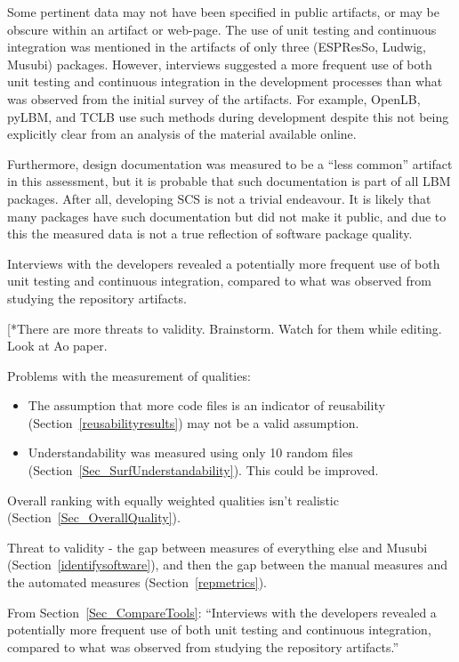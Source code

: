 \documentclass[runningheads]{llncs}
\begin{document}
Some pertinent data may not have been specified in public artifacts, or may be
obscure within an artifact or web-page. The use of unit testing and continuous
integration was mentioned in the artifacts of only three (ESPResSo, Ludwig,
Musubi) packages. However, interviews suggested a more frequent use of both unit
testing and continuous integration in the development processes than what was
observed from the initial survey of the artifacts. For example, OpenLB, pyLBM,
and TCLB use such methods during development despite this not being explicitly
clear from an analysis of the material available online. 

Furthermore, design documentation was measured to be a ``less common'' artifact
in this assessment, but it is probable that such documentation is part of all
LBM packages. After all, developing SCS is not a trivial endeavour. It is likely
that many packages have such documentation but did not make it public, and due
to this the measured data is not a true reflection of software package quality.

Interviews with the developers revealed a potentially more frequent use of both
unit testing and continuous integration, compared to what was observed from
studying the repository artifacts.

[*{There are more threats to validity.  Brainstorm.  Watch for them while 
editing.  Look at Ao paper.}

Problems with the measurement of qualities:

\begin{itemize}
\item The assumption that more code files is an indicator of reusability
(Section~\ref{reusabilityresults}) may not be a valid assumption.
\item Understandability was measured using only 10 random files
(Section~\ref{Sec_SurfUnderstandability}).  This could be improved.
\end{itemize}

Overall ranking with equally weighted qualities isn't realistic
(Section~\ref{Sec_OverallQuality}).

Threat to validity - the gap between measures of everything else and Musubi
(Section~\ref{identifysoftware}), and then the gap between the manual measures
and the automated measures (Section~\ref{repmetrics}).

From Section~\ref{Sec_CompareTools}: ``Interviews with the developers revealed a
potentially more frequent use of both unit testing and continuous integration,
compared to what was observed from studying the repository artifacts.''
\end{document}
